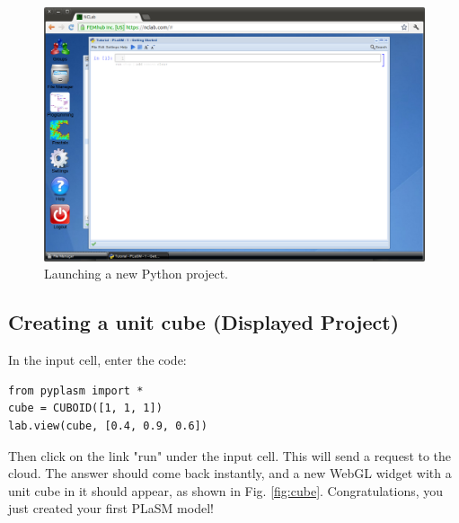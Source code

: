 \documentclass[article,A4,12pt]{llncs}
\begin{document}
\begin{figure}[!ht]
\begin{center}
\includegraphics[width=\textwidth]{img/python.png}
\end{center}
\caption{Launching a new Python project.}
\label{fig:python}
\end{figure}
\noindent



\subsection{Creating a unit cube (Displayed Project)}

In the input cell, enter the code:

\begin{verbatim}
from pyplasm import *
cube = CUBOID([1, 1, 1])
lab.view(cube, [0.4, 0.9, 0.6])
\end{verbatim}
Then click on the link "run" under the input cell. This will send a request 
to the cloud. The answer should come back instantly, and a new WebGL widget 
with a unit cube in it should appear, as shown in Fig. \ref{fig:cube}. 
Congratulations, you just created your first PLaSM model!
\end{document}
